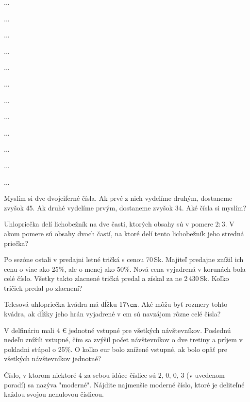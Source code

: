 {%
...}

{%
...}

{%
...}

{%
...}

{%
...}

{%
...}

{%
...}

{%
...}

{%
...}

{%
...}

{%
...}

{%
...}

{%
Myslím si dve dvojciferné čísla. Ak prvé z nich vydelíme druhým, dostaneme zvyšok $45$. Ak
druhé vydelíme prvým, dostaneme zvyšok $34$. Aké čísla si myslím?}

{%
Uhlopriečka delí lichobežník na dve časti, ktorých obsahy sú v pomere $2:3$. V akom pomere sú
obsahy dvoch častí, na ktoré delí tento lichobežník jeho stredná priečka?}

{%
Po sezóne ostali v predajni letné tričká s cenou 70\,Sk. Majiteľ predajne znížil ich cenu o viac
ako 25\%, ale o menej ako 50\%. Nová cena vyjadrená v korunách bola celé číslo. Všetky takto
zlacnené tričká predal a získal za ne 2\,430\,Sk. Koľko tričiek predal po zlacnení?}

{%
Telesová uhlopriečka kvádra má dĺžku $17\cm$. Aké môžu byť rozmery tohto kvádra, ak dĺžky jeho
hrán vyjadrené v cm sú navzájom rôzne celé čísla?}

{%
V delfináriu mali 4 € jednotné vstupné pre všetkých návštevníkov. Poslednú nedeľu znížili
vstupné, čím sa zvýšil počet návštevníkov o dve tretiny a príjem v pokladni stúpol o 25\%. O koľko
eur bolo znížené vstupné, ak bolo opäť pre všetkých návštevníkov jednotné?}

{%
Číslo, v ktorom niektoré 4 za sebou idúce číslice sú $2$, $0$, $0$, $3$ (v uvedenom poradí) sa nazýva "moderné".
Nájdite najmenšie moderné číslo, ktoré je deliteľné každou svojou nenulovou číslicou.}

